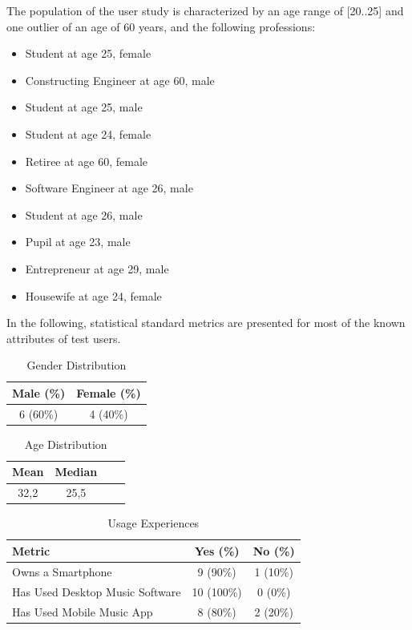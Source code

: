The population of the user study is characterized by an age range of [20..25] and one outlier of an age of 60 years, and the following professions:

\begin{itemize}
	\item Student at age 25, female
	\item Constructing Engineer at age 60, male
	\item Student at age 25, male
	\item Student at age 24, female
	\item Retiree at age 60, female
	\item Software Engineer at age 26, male
	\item Student at age 26, male
	\item Pupil at age 23, male
	\item Entrepreneur at age 29, male
	\item Housewife at age 24, female
\end{itemize}

In the following, statistical standard metrics are presented for most of the known attributes of test users.

\begin{table}[H]
\begin{center}
\begin{tabular}{ | c | c | }
	\hline
	\textbf{Male (\%)} & \textbf{Female (\%)} \\ \hline
	6 (60\%) & 4 (40\%) \\ \hline
\end{tabular}
\caption {Gender Distribution} \label{tab:gender} 
\end{center}
\end{table}

\begin{table}[H]
\begin{center}
\begin{tabular}{ | c | c | c | c | }
	\hline
	\textbf{Mean} & \textbf{Median}\\ \hline
	32,2 & 25,5 \\ \hline
\end{tabular}
\caption {Age Distribution} \label{tab:age-distribution} 
\end{center}
\end{table}

\begin{table}[H]
\begin{center}
\begin{tabular}{ | l | c | c | }
	\hline
	\textbf{Metric} & \textbf{Yes (\%)} & \textbf{No (\%)} \\ \hline
	Owns a Smartphone & 9 (90\%) & 1 (10\%) \\ \hline
	Has Used Desktop Music Software & 10 (100\%) & 0 (0\%) \\ \hline
	Has Used Mobile Music App & 8 (80\%) & 2 (20\%) \\ \hline
\end{tabular}
\caption {Usage Experiences} \label{tab:usage-experiences} 
\end{center}
\end{table}

